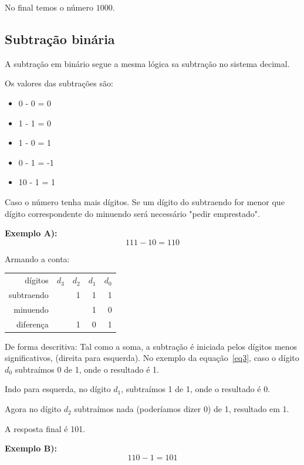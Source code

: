 No final temos o número $1000$.


\subsection{Subtração binária}

A subtração em binário segue a mesma lógica sa subtração no sistema decimal. 

Os valores das subtrações são:
\begin{itemize}
	\item 0 - 0 = 0
	\item 1 - 1 = 0
	\item 1 - 0 = 1
	\item 0 - 1 = -1
	\item 10 - 1 = 1
\end{itemize}

Caso o número tenha mais dígitos. Se um dígito do subtraendo for menor que dígito correspondente do minuendo será necessário "pedir emprestado".

\textbf{Exemplo A):}
\begin{equation}\label{eq3}
111 - 10 = 110
\end{equation}

Armando a conta:
\begin{table}[h]
	\centering
	\begin{tabular}{r|rrrr}
		dígitos		& $d_3$	& $d_2$ & $d_1$ & $d_0$ \\
		subtraendo  &  		&   1 	& 1 	& 1 \\
		minuendo 	&  		&   	& 1 	& 0 \\
		\hline
		diferença  	&  		&   1 	& 0 	& 1 \\
	\end{tabular}
\end{table}

De forma descritiva: 
Tal como a soma, a subtração é iniciada pelos dígitos menos significativos, (direita para esquerda). No exemplo da equação~\ref{eq3}, caso o dígito $d_0$ subtraímos 0 de 1, onde o resultado é 1.

Indo para esquerda, no dígito $d_1$, subtraímos 1 de 1, onde o resultado é 0.

Agora no dígito $d_2$ subtraímos nada (poderíamos dizer 0) de 1, resultado em 1.

A resposta final é 101.

\textbf{Exemplo B):}
\begin{equation}\label{eq4}
110 - 1 = 101
\end{equation}

